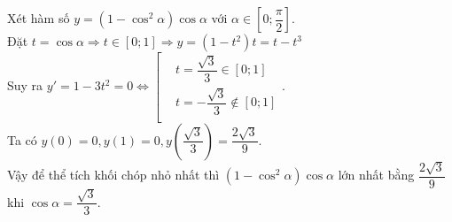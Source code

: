 \begin{ex}
{		Xét hàm số $ y=\left(1-\cos^2\alpha\right)\cos\alpha $ với $\alpha\in\left[0;\dfrac{\pi}{2}\right]$.\\
		Đặt $ t=\cos\alpha\Rightarrow t\in\left[0;1\right]\Rightarrow y=\left(1-t^2\right)t=t-t^3$\\
		Suy ra $y'=1-3t^2=0\Leftrightarrow\left[\begin{aligned}
			&t=\dfrac{\sqrt{3}}{3}\in\left[0;1\right]\\ 
			&t=-\dfrac{\sqrt{3}}{3}\notin\left[0;1\right]\\ 
		\end{aligned}\right.$.\\
		Ta có $y(0)=0,y(1)=0,y\left(\dfrac{\sqrt{3}}{3}\right)=\dfrac{2\sqrt{3}}{9}.$\\
		Vậy để thể tích khối chóp nhỏ nhất thì $\left(1-\cos^2\alpha\right)\cos\alpha$ lớn nhất bằng $\dfrac{2\sqrt{3}}{9}$ khi $\cos\alpha=\dfrac{\sqrt{3}}{3}$.
	}
\end{ex}


